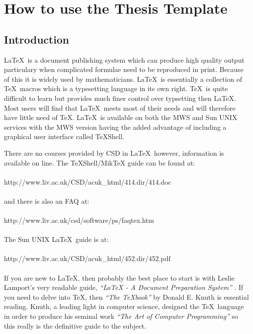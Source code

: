 \documentclass[11pt,oneside]{book}
\begin{document}
\mainmatter

\chapter{How to use the Thesis Template}
\section{Introduction}

\LaTeX \ is a document publishing system which can produce high quality
output particulary when complicated formulae need to be reproduced in print.
Because of this it is widely used by mathematicians. \LaTeX \ is essentially
a collection of \TeX \ macros which is a typesetting language in its own right.
\TeX \ is quite difficult to learn but provides much finer control over typsetting
then \LaTeX. Most users will find that \LaTeX \ meets most of their
needs and will therefore have little need of \TeX. \LaTeX \ is available on
both the MWS and Sun UNIX services with the MWS
version having the added advantage of including a graphical user interface called
TeXShell.

There are no courses provided by CSD in \LaTeX \ however, information is available
on line. The TeXShell/MikTeX guide can be found at:
\\
\\
http://www.liv.ac.uk/CSD/acuk\_html/414.dir/414.doc
\\
\\
and there is also an FAQ at:
\\
\\
http://www.liv.ac.uk/csd/software/ps/faqtex.htm
\\
\\
The Sun UNIX \LaTeX \ guide is at:
\\
\\
http://www.liv.ac.uk/CSD/acuk\_html/452.dir/452.pdf
\\
\\
If you are new to \LaTeX, then probably the best place to start is with
Leslie Lamport's very readable guide, {\em ``LaTeX - A Document Preparation
System''} \cite{latex} . If you need to delve into \TeX, then {\em ``The TeXbook''} \cite{texbook} by
Donald E. Knuth is essential reading. Knuth, a leading light in
computer science, designed the \TeX \ language in order to produce
his seminal work {\em ``The Art of Computer Programming''} \cite{artbook} so this really
is the definitive guide to the subject.
\end{document}
